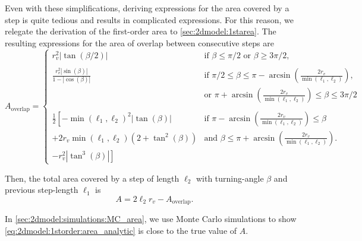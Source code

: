 Even with these simplifications, deriving expressions for the area covered by a step is quite tedious and results in complicated expressions. 
For this reason, we relegate the derivation of the first-order area to \cref{sec:2dmodel:1starea}.
The resulting expressions for the area of overlap between consecutive steps 
are
\begin{equation*}
A_{\text{overlap}} = 
\begin{cases}
r_v^2 \left|\tan(\beta/2)\right| \quad &\text{if } \beta \leq \pi/2 \text{ or } \beta \geq 3\pi/2,\\\\
\displaystyle \frac{r_v^2 \left|\sin(\beta)\right|}{1-\left|\cos(\beta) \right|} &\text{if } \pi/2  \leq \beta \leq  \pi-\arcsin\left( \frac{2r_v}{\min(\ell_1,\ell_2)} \right),\\
&\text{or }\pi+\arcsin\left( \frac{2r_v}{\min(\ell_1,\ell_2)} \right) \leq \beta \leq 3\pi/2\\\\
\displaystyle \frac{1}{2} \left[-\min(\ell_1,\ell_2)^2 \left|\tan(\beta)\right| \right. &\text{if }\pi-\arcsin\left( \frac{2r_v}{\min(\ell_1,\ell_2)} \right) \leq \beta\\
\left.+ 2r_v \min(\ell_1,\ell_2)(2+\tan^2(\beta))\right.  &\text{and } \beta \leq \pi +\arcsin\left( \frac{2r_v}{\min(\ell_1,\ell_2)} \right).\\
\left. - r_v^2 \left|\tan^3(\beta)\right| \right]   
\end{cases}
\end{equation*}

Then, the total area covered by a step of length $\ell_2$ with turning-angle $\beta$ and previous step-length $\ell_1$ is
\begin{equation}
\label{eq:2dmodel:1storder:area_analytic}
A = 2\ell_2 r_v - A_{\text{overlap}}.
\end{equation}


In \cref{sec:2dmodel:simulations:MC_area}, we use Monte Carlo simulations to show \cref{eq:2dmodel:1storder:area_analytic} is close to the true value of $A$.

